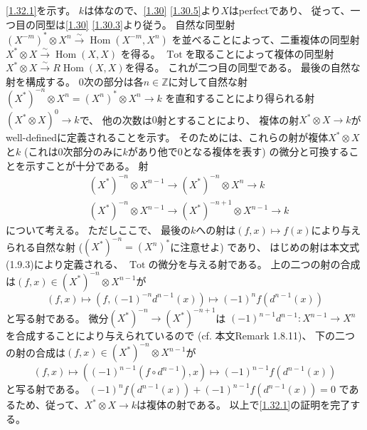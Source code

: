 \documentclass[uplatex,dvipdfmx]{jsarticle}
\makeatletter
\theoremstyle{definition}
\renewenvironment{proof}[1][\proofname]{
  \pushQED{\qed}%
  \normalfont \topsep6\p@\@plus6\p@\relax
  \trivlist
  \item[\hskip\labelsep
    #1\@addpunct{\textbf{.}}]\ignorespaces
}{%
  \popQED\endtrivlist\@endpefalse
}
\providecommand{\proofname}{証明}
\DeclareMathOperator{\Hom}{\mathrm{Hom}}
\DeclareMathOperator{\Tot}{\mathrm{Tot}}
\newcommand\Z{\mathbb{Z}}
\makeatother
\begin{document}
\begin{proof}
  \ref{1.32.1}を示す。
  \(k\)は体なので、\autoref{1.30} \ref{1.30.5}より\(X\)はperfectであり、
  従って、一つ目の同型は\autoref{1.30} \ref{1.30.3}より従う。
  自然な同型射
  \((X^{-m})^*\otimes X^n \xrightarrow{\sim} \Hom(X^{-m},X^n)\)
  を並べることによって、二重複体の同型射
  \(X^*\otimes X\xrightarrow{\sim}\Hom(X,X)\)
  を得る。
  \(\Tot\)を取ることによって複体の同型射
  \(X^*\otimes X \xrightarrow{\sim} R\Hom(X,X)\)を得る。
  これが二つ目の同型である。
  最後の自然な射を構成する。
  \(0\)次の部分は各\(n\in \Z\)に対して自然な射
  \((X^*)^{-n}\otimes X^n = (X^n)^*\otimes X^n \to k\)
  を直和することにより得られる射\((X^*\otimes X)^0\to k\)で、
  他の次数は\(0\)射とすることにより、
  複体の射\(X^*\otimes X \to k\)がwell-definedに定義されることを示す。
  そのためには、これらの射が複体\(X^*\otimes X\)と\(k\)
  (これは\(0\)次部分のみに\(k\)があり他で\(0\)となる複体を表す)
  の微分と可換することを示すことが十分である。
  射
  \begin{align*}
    &(X^*)^{-n}\otimes X^{n-1} \to (X^*)^{-n}\otimes X^n \to k \\
    &(X^*)^{-n}\otimes X^{n-1} \to (X^*)^{-n+1}\otimes X^{n-1} \to k
  \end{align*}
  について考える。
  ただしここで、
  最後の\(k\)への射は\((f,x)\mapsto f(x)\)により与えられる自然な射
  (\((X^*)^{-n}=(X^n)^*\)に注意せよ) であり、
  はじめの射は本文式(1.9.3)により定義される、
  \(\Tot\)の微分を与える射である。
  上の二つの射の合成は\((f,x)\in (X^*)^{-n}\otimes X^{n-1}\)が
  \[(f,x)\mapsto (f,(-1)^{-n}d^{n-1}(x)) \mapsto (-1)^nf(d^{n-1}(x))\]
  と写る射である。
  微分\((X^*)^{-n}\to (X^*)^{-n+1}\)は
  \((-1)^{n-1}d^{n-1}:X^{n-1}\to X^n\)を合成することにより与えられているので
  (cf. 本文Remark 1.8.11)、
  下の二つの射の合成は\((f,x)\in (X^*)^{-n}\otimes X^{n-1}\)が
  \[(f,x)\mapsto ((-1)^{n-1}(f\circ d^{n-1}),x) \mapsto (-1)^{n-1}f(d^{n-1}(x))\]
  と写る射である。
  \((-1)^nf(d^{n-1}(x))+(-1)^{n-1}f(d^{n-1}(x)) = 0\)
  であるため、従って、\(X^*\otimes X\to k\)は複体の射である。
  以上で\ref{1.32.1}の証明を完了する。


\end{proof}
\end{document}

